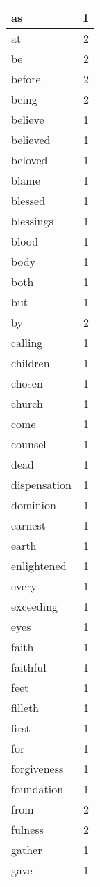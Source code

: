 \begin{center}
\begin{longtable}{l|r}
as & 1\\ \hline 
at & 2\\ \hline 
be & 2\\ \hline 
before & 2\\ \hline 
being & 2\\ \hline 
believe & 1\\ \hline 
believed & 1\\ \hline 
beloved & 1\\ \hline 
blame & 1\\ \hline 
blessed & 1\\ \hline 
blessings & 1\\ \hline 
blood & 1\\ \hline 
body & 1\\ \hline 
both & 1\\ \hline 
but & 1\\ \hline 
by & 2\\ \hline 
calling & 1\\ \hline 
children & 1\\ \hline 
chosen & 1\\ \hline 
church & 1\\ \hline 
come & 1\\ \hline 
counsel & 1\\ \hline 
dead & 1\\ \hline 
dispensation & 1\\ \hline 
dominion & 1\\ \hline 
earnest & 1\\ \hline 
earth & 1\\ \hline 
enlightened & 1\\ \hline 
every & 1\\ \hline 
exceeding & 1\\ \hline 
eyes & 1\\ \hline 
faith & 1\\ \hline 
faithful & 1\\ \hline 
feet & 1\\ \hline 
filleth & 1\\ \hline 
first & 1\\ \hline 
for & 1\\ \hline 
forgiveness & 1\\ \hline 
foundation & 1\\ \hline 
from & 2\\ \hline 
fulness & 2\\ \hline 
gather & 1\\ \hline 
gave & 1\\ \hline 

\end{longtable}
\end{center}
